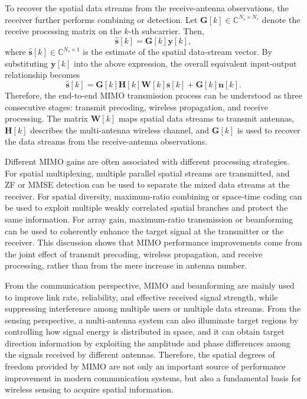 To recover the spatial data streams from the receive-antenna observations,
the receiver further performs combining or detection.
Let \(\mathbf{G}[k]\in\mathbb{C}^{N_s\times N_r}\) denote the receive processing matrix on the \(k\)-th subcarrier.
Then,
\[
\hat{\mathbf{s}}[k]
=
\mathbf{G}[k]\mathbf{y}[k],
\]
where
\(\hat{\mathbf{s}}[k]\in\mathbb{C}^{N_s\times 1}\)
is the estimate of the spatial data-stream vector.
By substituting \(\mathbf{y}[k]\) into the above expression,
the overall equivalent input-output relationship becomes
\begin{equation}
\hat{\mathbf{s}}[k]
=
\mathbf{G}[k]\mathbf{H}[k]\mathbf{W}[k]\mathbf{s}[k]
+
\mathbf{G}[k]\mathbf{n}[k].
\label{eq:mimo_end_to_end_model}
\end{equation}
Therefore,
the end-to-end MIMO transmission process can be understood as three consecutive stages:
transmit precoding,
wireless propagation,
and receive processing.
The matrix \(\mathbf{W}[k]\) maps spatial data streams to transmit antennas,
\(\mathbf{H}[k]\) describes the multi-antenna wireless channel,
and \(\mathbf{G}[k]\) is used to recover the data streams from the receive-antenna observations.

Different MIMO gains are often associated with different processing strategies.
For spatial multiplexing,
multiple parallel spatial streams are transmitted,
and \acs{ZF} or MMSE detection can be used to separate the mixed data streams at the receiver.
For spatial diversity,
maximum-ratio combining or space-time coding can be used to exploit multiple weakly correlated spatial branches
and protect the same information.
For array gain,
maximum-ratio transmission or beamforming can be used to coherently enhance the target signal
at the transmitter or the receiver.
This discussion shows that MIMO performance improvements come from the joint effect of transmit precoding,
wireless propagation,
and receive processing,
rather than from the mere increase in antenna number.

From the communication perspective,
MIMO and beamforming are mainly used to improve link rate,
reliability,
and effective received signal strength,
while suppressing interference among multiple users or multiple data streams.
From the sensing perspective,
a multi-antenna system can also illuminate target regions
by controlling how signal energy is distributed in space,
and it can obtain target direction information
by exploiting the amplitude and phase differences among the signals received by different antennas.
Therefore,
the spatial degrees of freedom provided by MIMO are not only an important source of performance improvement
in modern communication systems,
but also a fundamental basis for wireless sensing to acquire spatial information.

